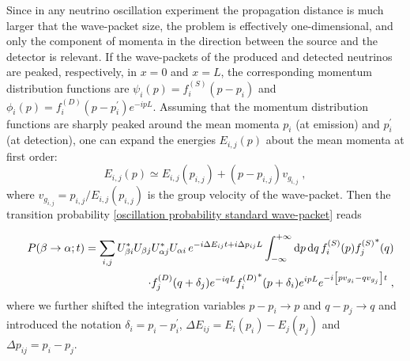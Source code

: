 \documentclass[11pt]{article}
\begin{document}
 Since in any neutrino oscillation experiment the propagation distance is much larger that the wave-packet size, the problem is effectively one-dimensional, and only the component of momenta in the direction between the source and the detector is relevant. If the wave-packets of the produced and detected neutrinos are  peaked, respectively, in $x=0$ and $x=L$,  the corresponding momentum distribution functions are $\psi_i(p)=f_i^{(S)}(p-p_i)$  and $\phi_i(p) = f_i^{(D)}(p-p^\prime_i)e^{-ipL}$. Assuming that the momentum distribution functions are sharply peaked around the mean momenta $p_i$ (at emission) and $p_i^\prime$ (at detection), one can  expand the energies $E_{i,j}(p)$  about the mean momenta at first order:
\begin{equation}
    E_{i,j}(p)
    \simeq E_{i,j}(p_{i,j}) + (p-p_{i,j})v_{g_{i,j}}\;,
\end{equation}
where $v_{g_{i,j}}=p_{i,j}/E_{i,j}(p_{i,j})$ is the group velocity of the wave-packet. Then the transition probability \eqref{oscillation probability standard wave-packet} reads

\begin{eqnarray}
    &&P(\beta\to\alpha;t) = \sum_{i,j} U^*_{\beta i} U_{\beta j} U^*_{\alpha j} U_{\alpha i} \,e^{-i\Delta E_{ij}t+i\Delta p_{ij}L} \int_{-\infty}^{+\infty}\text{d}{p}\,\text{d}{q}\,f_i^{(S)}(p){f_j^{(S)}}^*(q) \nonumber \\ &&\cdot f_j^{(D)}(q+\delta_j) e^{-iq L} {f_i^{(D)}}^*(p+\delta_i) e^{ipL} e^{-i\qty[pv_{g_i}-qv_{g_j}]t}\;,\label{prob}
\end{eqnarray}
where we further  shifted the integration variables $p-p_i \to p$ and $q-p_j \to q$ and introduced the notation $\delta_i = p_i-p_i^\prime$, $\Delta E_{ij} = E_i(p_i)-E_j(p_j)$ and $\Delta p_{ij} = p_i-p_j$.
\end{document}
